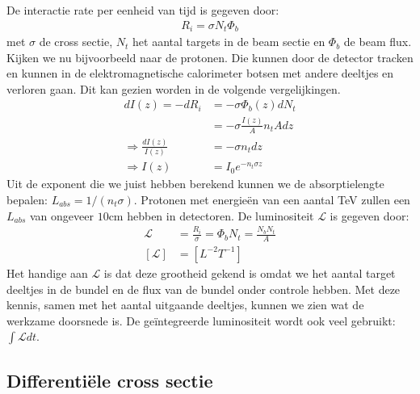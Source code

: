 \documentclass[../main.tex]{subfiles}
\begin{document}
De interactie rate per eenheid van tijd is gegeven door:
\begin{equation}
    \begin{aligned}
        \label{eq:int_rate}
        R_i=\sigma N_t \Phi_b
    \end{aligned}
\end{equation}
met $\sigma$ de cross sectie, $N_t$ het aantal targets in de beam sectie en $\Phi_b$ de beam flux. Kijken we nu bijvoorbeeld naar de protonen. Die kunnen door de detector tracken en kunnen in de elektromagnetische calorimeter botsen met andere deeltjes en verloren gaan. Dit kan gezien worden in de volgende vergelijkingen.
\begin{equation}
    \begin{aligned}
        \label{eq:beam_intensity}
        dI(z) = -dR_i &= -\sigma\Phi_b(z)dN_t\\
                      &= -\sigma\frac{I(z)}{A}n_tAdz\\
        \Rightarrow\frac{dI(z)}{I(z)}&=-\sigma n_tdz\\
        \Rightarrow I(z)&=I_0e^{-n_t\sigma z}
    \end{aligned}
\end{equation}
Uit de exponent die we juist hebben berekend kunnen we de absorptielengte bepalen: $L_{abs}=1/(n_t\sigma)$. Protonen met energieën van een aantal TeV zullen een $L_{abs}$ van ongeveer $10$cm hebben in detectoren. De luminositeit $\mathcal{L}$ is gegeven door:
\begin{equation}
    \begin{aligned}
        \label{eq:luminositeit}
        \mathcal{L} &= \frac{R_i}{\sigma} = \Phi_b N_t = \frac{N_bN_t}{A}\\
        [\mathcal{L}] &= [L^{-2}T^{-1}]
    \end{aligned}
\end{equation}
Het handige aan $\mathcal{L}$ is dat deze grootheid gekend is omdat we het aantal target deeltjes in de bundel en de flux van de bundel onder controle hebben. Met deze kennis, samen met het aantal uitgaande deeltjes, kunnen we zien wat de werkzame doorsnede is. De geïntegreerde luminositeit wordt ook veel gebruikt: $\int \mathcal{L}dt$.

\subsection{Differentiële cross sectie}%
\label{sub:differentiele_cross_sectie}
\end{document}
